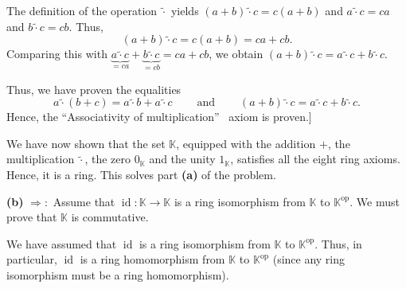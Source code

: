 \documentclass[paper=a4, fontsize=12pt]{scrartcl}%
\theoremstyle{plainsl}
\theoremstyle{definition}
\theoremstyle{remark}
\begin{document}
The definition of the operation $\left.  \widetilde{\cdot}\right.  $ yields
$\left(  a+b\right)  \left.  \widetilde{\cdot}\right.  c=c\left(  a+b\right)
$ and $a\left.  \widetilde{\cdot}\right.  c=ca$ and $b\left.  \widetilde{\cdot
}\right.  c=cb$. Thus,%
\[
\left(  a+b\right)  \left.  \widetilde{\cdot}\right.  c=c\left(  a+b\right)
=ca+cb.
\]
Comparing this with $\underbrace{a\left.  \widetilde{\cdot}\right.  c}%
_{=ca}+\underbrace{b\left.  \widetilde{\cdot}\right.  c}_{=cb}=ca+cb$, we
obtain $\left(  a+b\right)  \left.  \widetilde{\cdot}\right.  c=a\left.
\widetilde{\cdot}\right.  c+b\left.  \widetilde{\cdot}\right.  c$.

Thus, we have proven the equalities%
\[
a\left.  \widetilde{\cdot}\right.  \left(  b+c\right)  =a\left.
\widetilde{\cdot}\right.  b+a\left.  \widetilde{\cdot}\right.
c\ \ \ \ \ \ \ \ \ \ \text{and}\ \ \ \ \ \ \ \ \ \ \left(  a+b\right)  \left.
\widetilde{\cdot}\right.  c=a\left.  \widetilde{\cdot}\right.  c+b\left.
\widetilde{\cdot}\right.  c.
\]
Hence, the \textquotedblleft Associativity of multiplication\textquotedblright%
\ axiom is proven.]

We have now shown that the set $\mathbb{K}$, equipped with the addition $+$,
the multiplication $\left.  \widetilde{\cdot}\right.  $, the zero
$0_{\mathbb{K}}$ and the unity $1_{\mathbb{K}}$, satisfies all the eight ring
axioms. Hence, it is a ring. This solves part \textbf{(a)} of the problem.

\bigskip

\textbf{(b)} $\Longrightarrow:$ Assume that $\operatorname{id}:\mathbb{K}%
\rightarrow\mathbb{K}$ is a ring isomorphism from $\mathbb{K}$ to
$\mathbb{K}^{\operatorname{op}}$. We must prove that $\mathbb{K}$ is commutative.

We have assumed that $\operatorname*{id}$ is a ring isomorphism from
$\mathbb{K}$ to $\mathbb{K}^{\operatorname{op}}$. Thus, in particular,
$\operatorname*{id}$ is a ring homomorphism from $\mathbb{K}$ to
$\mathbb{K}^{\operatorname{op}}$ (since any ring isomorphism must be a ring homomorphism).
\end{document}
